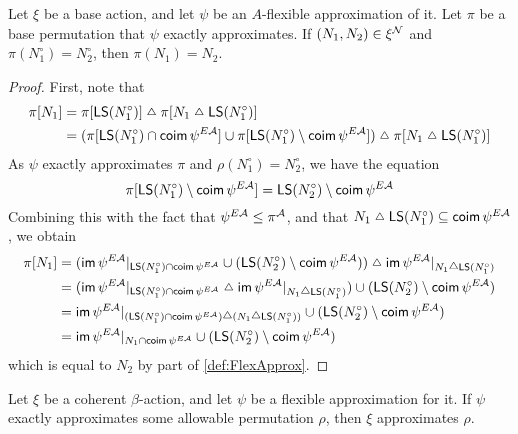 \begin{proposition}
  \label{prop:FlexApprox.smul_nearLitter_eq}
  Let \( \xi \) be a base action, and let \( \psi \) be an \( A \)-flexible approximation of it.
  Let \( \pi \) be a base permutation that \( \psi \) exactly approximates.
  If \( (N_1, N_2) \in \xi^{\mathcal N} \) and \( \pi(N_1^\circ) = N_2^\circ \), then \( \pi(N_1) = N_2 \).
\end{proposition}
\begin{proof}
  First, note that
  \begin{align*}
    \pi[N_1] &= \pi[\LS(N_1^\circ)] \symmdiff \pi[N_1 \symmdiff \LS(N_1^\circ)] \\
    &= (\pi[\LS(N_1^\circ) \cap \coim \psi^{E\Atom}] \cup \pi[\LS(N_1^\circ) \setminus \coim \psi^{E\Atom}]) \symmdiff \pi[N_1 \symmdiff \LS(N_1^\circ)]
  \end{align*}
  As \( \psi \) exactly approximates \( \pi \) and \( \rho(N_1^\circ) = N_2^\circ \), we have the equation
  \[ \pi[\operatorname{\mathsf{LS}}(N_1^\circ) \setminus \operatorname{\mathsf{coim}} \psi^{E{\mathcal A}}] = \operatorname{\mathsf{LS}}(N_2^\circ) \setminus \operatorname{\mathsf{coim}} \psi^{E{\mathcal A}} \]
  Combining this with the fact that \( \psi^{E{\mathcal A}} \leq \pi^{\mathcal A} \), and that \( N_1 \symmdiff \LS(N_1^\circ) \subseteq \coim \psi^{E\Atom} \), we obtain
  \begin{align*}
    \pi[N_1]
    &= (\im \psi^{E\Atom}|_{\LS(N_1^\circ) \cap \coim \psi^{E\Atom}} \cup (\LS(N_2^\circ) \setminus \coim \psi^{E\Atom})) \symmdiff \im \psi^{E\Atom}|_{N_1 \symmdiff \LS(N_1^\circ)} \\
    &= (\im \psi^{E\Atom}|_{\LS(N_1^\circ) \cap \coim \psi^{E\Atom}} \symmdiff \im \psi^{E\Atom}|_{N_1 \symmdiff \LS(N_1^\circ)})  \cup (\LS(N_2^\circ) \setminus \coim \psi^{E\Atom}) \\
    &= \im \psi^{E\Atom}|_{(\LS(N_1^\circ) \cap \coim \psi^{E\Atom}) \symmdiff (N_1 \symmdiff \LS(N_1^\circ))} \cup (\LS(N_2^\circ) \setminus \coim \psi^{E\Atom}) \\
    &= \im \psi^{E\Atom}|_{N_1 \cap \coim \psi^{E\Atom}} \cup (\LS(N_2^\circ) \setminus \coim \psi^{E\Atom})
  \end{align*}
  which is equal to \( N_2 \) by part of \cref{def:FlexApprox}.
\end{proof}
\begin{proposition}
  \label{prop:approximates_of_flexApprox}
  Let \( \xi \) be a coherent \( \beta \)-action, and let \( \psi \) be a flexible approximation for it.
  If \( \psi \) exactly approximates some allowable permutation \( \rho \), then \( \xi \) approximates \( \rho \).
\end{proposition}
